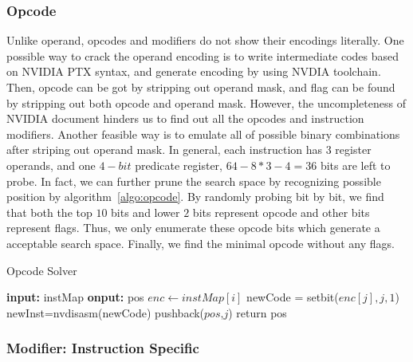 \subsubsection{Opcode}
Unlike operand, opcodes and modifiers do not show their encodings literally. One possible way to crack the operand 
encoding is to write intermediate codes
based on NVIDIA PTX syntax, and generate encoding by using NVDIA toolchain.
Then, opcode can be got by stripping out operand mask, and flag can be found by stripping out both opcode and operand 
mask. However, the uncompleteness of NVIDIA document hinders us to find out all the opcodes and instruction modifiers. 
Another feasible way is to emulate all of possible binary combinations after striping out operand mask.
In general, each instruction has $3$ register operands, and one $4-bit$ predicate register, $64-8*3-4=36$ bits are left 
to probe.
In fact, we can further prune the search space by recognizing possible position by algorithm~\ref{algo:opcode}. By 
randomly probing bit by bit, we find that both the top $10$ bits and lower $2$ bits represent opcode and other bits 
represent flags. Thus, we only enumerate these opcode bits which generate a acceptable search space. Finally, we find 
the minimal opcode without any flags. 


\begin{algorithm}
      \caption{Opcode Solver}\label{algo:opcode}
  \begin{algorithmic}[1]
      \State \textbf {input:} instMap
      \State \textbf {onput:} pos
      \State $enc \gets instMap[i]$ 
      \State newCode = setbit($enc[j], j, 1$)
      \State newInst=nvdisasm(newCode)
      \State pushback($pos$,$j$)
      \EndIf
      \EndIf
      \EndFor
      \EndFor
      \State return pos
  \end{algorithmic}
\end{algorithm}

\subsubsection{Modifier: Instruction Specific}

